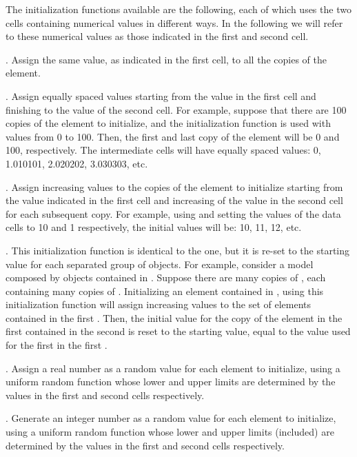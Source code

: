 \documentclass [11pt,a4paper] {book}
\begin{document}
The initialization functions available are the following, each of which uses the two cells containing numerical values in different ways. In the following we will refer to these numerical values as those indicated in the first and second cell.

. Assign the same value, as indicated in the first cell, to all the copies of the element.

. Assign equally spaced values starting from the value in the first cell and finishing to the value of the second cell. For example, suppose that there are 100 copies of the element to initialize, and the initialization function  is used with values from 0 to 100. Then, the first and last copy of the element will be 0 and 100, respectively. The intermediate cells will have equally spaced values: 0, 1.010101, 2.020202, 3.030303, etc.

. Assign increasing values to the copies of the element to initialize starting from the value indicated in the first cell and increasing of the value in the second cell for each subsequent copy. For example, using  and setting the values of the data cells to 10 and 1 respectively, the initial values will be: 10, 11, 12, etc.

. This initialization function is identical to the  one, but it is re-set to the starting value for each separated group of objects. For example, consider a model composed by objects  contained in . Suppose there are many copies of , each containing many copies of . Initializing an element contained in , using this initialization function will assign increasing values to the set of elements contained in the first . Then, the initial value for the copy of the element in the first  contained in the second  is reset to the starting value, equal to the value used for the first  in the first . 

. Assign a real number as a random value for each element to initialize, using a uniform random function whose lower and upper limits are determined by the values in the first and second cells respectively.

. Generate an integer number as a random value for each element to initialize, using a uniform random function whose lower and upper limits (included) are determined by the values in the first and second cells respectively.
\end{document}
